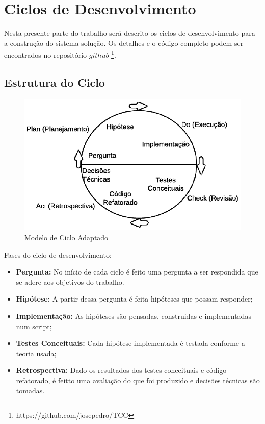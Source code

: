 \section {Ciclos de Desenvolvimento}
 
Nesta presente parte do trabalho será descrito os ciclos de desenvolvimento para a construção do sistema-solução. Os detalhes e o código completo podem ser encontrados no repositório $github$ \footnote{https://github.com/josepedro/TCC}.

\subsection{Estrutura do Ciclo}

\begin{figure}[h] 
  \centering
    \includegraphics[keepaspectratio=true, scale=0.85]{figuras/ciclo_desenvolvimento}
    \caption{Modelo de Ciclo Adaptado}
\end{figure}

Fases do ciclo de desenvolvimento:
\begin{itemize}
\item \textbf{Pergunta:} No início de cada ciclo é feito uma pergunta a ser respondida que se adere aos objetivos do trabalho.
\item \textbf{Hipótese:} A partir dessa pergunta é feita hipóteses que possam responder;
\item \textbf{Implementação:} As hipóteses são pensadas, construidas e implementadas num script;
\item \textbf{Testes Conceituais:} Cada hipótese implementada é testada conforme a teoria usada;
\item \textbf{Retrospectiva:} Dado os resultados dos testes conceituais e código refatorado, é feitto uma avaliação do que foi produzido e decisões técnicas são tomadas.
\end{itemize}
  
